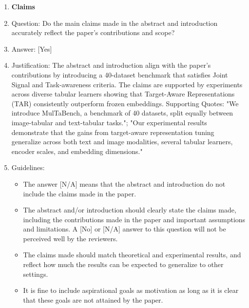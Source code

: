 \documentclass{llmxive}
\providecommand{\answerYes}[1][]{[Yes]#1}
\providecommand{\answerNo}[1][]{[No]#1}
\providecommand{\answerNA}[1][]{[N/A]#1}
\begin{document}
\begin{enumerate}

\item {\bf Claims}
    \item[] Question: Do the main claims made in the abstract and introduction accurately reflect the paper's contributions and scope?
    \item[] Answer: \answerYes{}
    \item[] Justification: The abstract and introduction align with the paper’s contributions by introducing a 40-dataset benchmark that satisfies Joint Signal and Task-awareness criteria. The claims are supported by experiments across diverse tabular learners showing that Target-Aware Representations (TAR) consistently outperform frozen embeddings. Supporting Quotes: "We introduce MulTaBench, a benchmark of 40 datasets, split equally between image-tabular and text-tabular tasks."; "Our experimental results demonstrate that the gains from target-aware representation tuning generalize across both text and image modalities, several tabular learners, encoder scales, and embedding dimensions."
    \item[] Guidelines:
    \begin{itemize}
        \item The answer \answerNA{} means that the abstract and introduction do not include the claims made in the paper.
        \item The abstract and/or introduction should clearly state the claims made, including the contributions made in the paper and important assumptions and limitations. A \answerNo{} or \answerNA{} answer to this question will not be perceived well by the reviewers. 
        \item The claims made should match theoretical and experimental results, and reflect how much the results can be expected to generalize to other settings. 
        \item It is fine to include aspirational goals as motivation as long as it is clear that these goals are not attained by the paper. 
    \end{itemize}


\end{enumerate}
\end{document}
